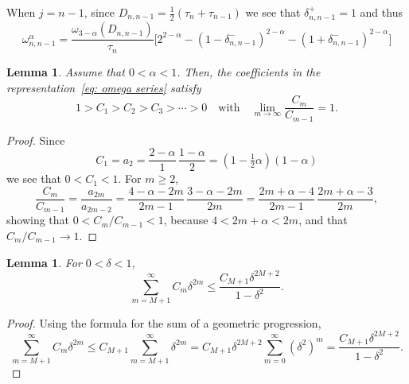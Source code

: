 \documentclass[a4paper,12pt]{article}
\newtheorem{lemma}[theorem]{Lemma}
\begin{document}
When $j=n-1$, since $D_{n,n-1}=\tfrac12(\tau_n+\tau_{n-1})$ we see that
$\delta_{n,n-1}^+=1$ and thus
\[
\omega^\alpha_{n,n-1}=\frac{\omega_{3-\alpha}(D_{n,n-1})}{\tau_n}\bigl[
    2^{2-\alpha}-(1-\delta_{n,n-1}^-)^{2-\alpha}
    -(1+\delta_{n,n-1}^-)^{2-\alpha}\bigr]
\]

\begin{lemma}
Assume that $0<\alpha<1$. Then, the coefficients in the
representation~\eqref{eq: omega series} satisfy
\[
1>C_1>C_2>C_3>\cdots>0\quad\text{with}\quad
\lim_{m\to\infty}\frac{C_m}{C_{m-1}}=1.
\]
\end{lemma}
\begin{proof}
Since
\[
C_1=a_2=\frac{2-\alpha}{1}\,\frac{1-\alpha}{2}=(1-\tfrac12\alpha)(1-\alpha)
\]
we see that $0<C_1<1$.  For $m\ge2$,
\[
\frac{C_m}{C_{m-1}}=\frac{a_{2m}}{a_{2m-2}}
    =\frac{4-\alpha-2m}{2m-1}\,\frac{3-\alpha-2m}{2m}
    =\frac{2m+\alpha-4}{2m-1}\,\frac{2m+\alpha-3}{2m},
\]
showing that $0<C_m/C_{m-1}<1$, because $4<2m+\alpha<2m$, and that
$C_m/C_{m-1}\to1$.
\end{proof}

\begin{lemma}
For $0<\delta<1$,
\[
\sum_{m=M+1}^\infty C_m\delta^{2m}\le \frac{C_{M+1}\delta^{2M+2}}{1-\delta^2}.
\]
\end{lemma}
\begin{proof}
Using the formula for the sum of a geometric progression,
\[
\sum_{m=M+1}^\infty C_m\delta^{2m}\le C_{M+1}\sum_{m=M+1}^\infty\delta^{2m}
    =C_{M+1}\delta^{2M+2}\sum_{m=0}^\infty(\delta^2)^m
    =\frac{C_{M+1}\delta^{2M+2}}{1-\delta^2}.
\]
\end{proof}








\end{document}
